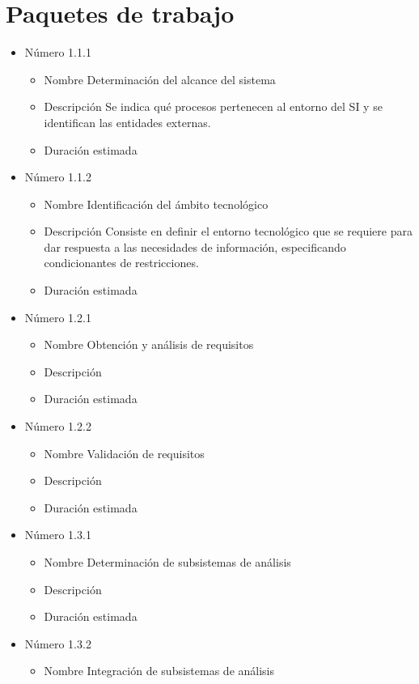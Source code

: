 \documentclass[11pt,a4paper,spanish,twoside]{report}
\begin{document}
\chapter{Paquetes de trabajo}
\begin{itemize}
\item{Número} 1.1.1
\begin{itemize}
\item{Nombre} Determinación del alcance del sistema
\item{Descripción} Se indica qué procesos pertenecen al entorno del SI y se 
identifican las entidades externas.
\item{Duración estimada} 
\end{itemize}
\item{Número} 1.1.2
\begin{itemize}
\item{Nombre} Identificación del ámbito tecnológico
\item{Descripción} Consiste en definir el entorno tecnológico que se requiere 
para dar respuesta a las necesidades de información, especificando 
condicionantes de restricciones.
\item{Duración estimada} 
\end{itemize}
\item{Número} 1.2.1
\begin{itemize}
\item{Nombre} Obtención y análisis de requisitos
\item{Descripción} 
\item{Duración estimada} 
\end{itemize}
\item{Número} 1.2.2
\begin{itemize}
\item{Nombre} Validación de requisitos
\item{Descripción} 
\item{Duración estimada} 
\end{itemize}
\item{Número} 1.3.1
\begin{itemize}
\item{Nombre} Determinación de subsistemas de análisis
\item{Descripción} 
\item{Duración estimada} 
\end{itemize}
\item{Número} 1.3.2
\begin{itemize}
\item{Nombre} Integración de subsistemas de análisis

\end{itemize}
\end{itemize}
\end{document}
